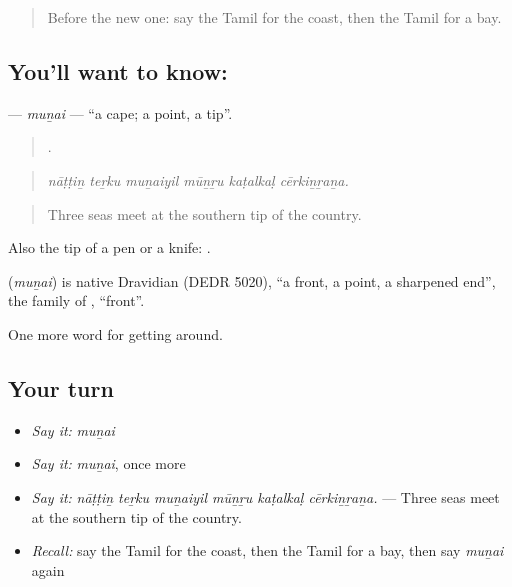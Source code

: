 \label{lesson:TA-C435-munai}



\begin{quote}
Before the new one: say the Tamil for the coast, then the Tamil for a bay.
\end{quote}

\subsection*{You'll want to know: }
\textbf{} — \emph{muṉai} — \textquotedblleft{}a cape; a point, a tip\textquotedblright{}.

\begin{quote}
     .
\end{quote}

\begin{quote}
\emph{nāṭṭiṉ teṟku muṉaiyil mūṉṟu kaṭalkaḷ cērkiṉṟaṉa.}
\end{quote}

\begin{quote}
Three seas meet at the southern tip of the country.
\end{quote}

Also the tip of a pen or a knife:  .

\begin{cousinweb}
\textbf{} (\emph{muṉai}) is native Dravidian (DEDR 5020), \textquotedblleft{}a front, a point, a sharpened end\textquotedblright{}, the family of , \textquotedblleft{}front\textquotedblright{}.
\end{cousinweb}

\begin{grammarlens}[title={What you've built}]
One more word for getting around.
\end{grammarlens}

\subsection*{Your turn}
\begin{itemize}
\raggedright
  \item \emph{Say it:} \emph{muṉai}
  \item \emph{Say it:} \emph{muṉai}, once more
  \item \emph{Say it:} \emph{nāṭṭiṉ teṟku muṉaiyil mūṉṟu kaṭalkaḷ cērkiṉṟaṉa.} — Three seas meet at the southern tip of the country.
  \item \emph{Recall:} say the Tamil for the coast, then the Tamil for a bay, then say \emph{muṉai} again
\end{itemize}

